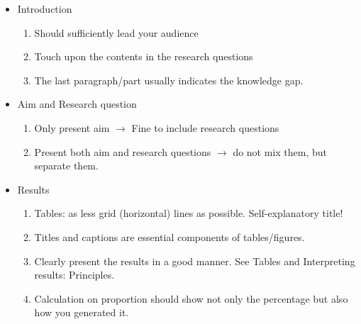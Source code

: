 \documentclass{beamer}
\begin{document}
\begin{frame}{\secname}
\begin{itemize}

	\item Introduction 
	\begin{enumerate}
 		\item Should sufficiently lead your audience
 		\item Touch upon the contents in the research questions
 		\item The last paragraph/part usually indicates the knowledge gap.
 \end{enumerate}
 	\item Aim and Research question
 	\begin{enumerate}
 		\item Only present aim $\rightarrow$ Fine to include research questions
 		\item Present both aim and research questions $\rightarrow$ do not mix them, but separate them.	
 	\end{enumerate}
	
	
	\item Results
	\begin{enumerate}
		\item Tables: as less grid (horizontal) lines as possible. Self-explanatory title!
		\item Titles and captions are essential components of tables/figures.
		\item Clearly present the results in a good manner. See Tables and Interpreting results: Principles. 
		\item Calculation on proportion should show not only the percentage but also how you generated it.
	\end{enumerate}
	\end{itemize}
\end{frame}
\end{document}
